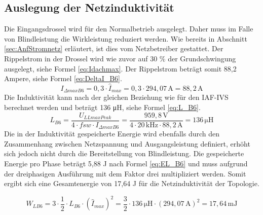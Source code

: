 		\subsection{Auslegung der Netzinduktivität}
				Die Eingangsdrossel wird für den Normalbetrieb ausgelegt. Daher muss im Falle von Blindleistung die Wirkleistung reduziert werden. Wie bereits in Abschnitt \ref{sec:AnfStromnetz} erläutert, ist dies vom Netzbetreiber gestattet. Der Rippelstrom in der Drossel wird wie zuvor auf 30 \% der Grundschwingung ausgelegt, siehe Formel \ref{eq:Idachmax}. Der Rippelstrom beträgt somit 88,2 Ampere, siehe Formel \ref{eq:DeltaI_B6}.\\
			
			\begin{equation}
				\label{eq:DeltaI_B6}
				I_{\Delta max B6}= 0,3 \cdot \hat{I}_{max}= 0,3 \cdot 294,07\, \si{\A} = 88,2\, \si{\A}
			\end{equation}
			Die Induktivität kann nach der gleichen Beziehung wie für den \gls{IAF}-\gls{IVS} berechnet werden und beträgt 136 \si{\micro \henry}, siehe Formel \ref{eq:L_B6}.
			\begin{equation}
				\label{eq:L_B6}
				L_{B6}= \dfrac{U_{LLmaxPeak}}{4\cdot f{sw} \cdot I_{\Delta max B6}} = \dfrac{959,8\, \si{\volt}}{4 \cdot 20\, \si{\kilo \hertz} \cdot 88,2\, \si{\ampere}} =136\, \si{\micro \henry}
			\end{equation}
			Die in der Induktivität gespeicherte Energie wird ebenfalls durch den Zusammenhang zwischen Netzspannung und Ausgangsleistung definiert, erhöht sich jedoch nicht durch die Bereitstellung von Blindleistung. Die gespeicherte Energie pro Phase beträgt 5,88 \si{\joule} nach Formel \ref{eq:EL_B6} und muss aufgrund der dreiphasigen Ausführung mit dem Faktor drei multipliziert werden. Somit ergibt sich eine Gesamtenergie von 17,64 \si{\joule} für die Netzinduktivität der Topologie.
			
			\begin{equation}
			\label{eq:EL_B6}
			W_{LB6}= 3 \cdot \dfrac{1}{2} \cdot L_{B6} \cdot (\hat{I}_{max})^{2}= \dfrac{3}{2} \cdot 136 \,\si{\micro \henry} \cdot (294,07\, \si{\A})^{2} = 17,64 \, \si{\milli \joule}
			\end{equation}
